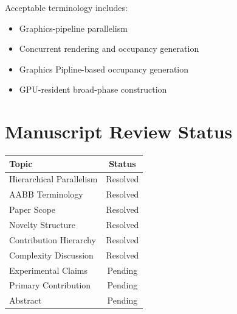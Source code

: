 Acceptable terminology includes:

\begin{itemize}
\item Graphics-pipeline parallelism
\item Concurrent rendering and occupancy generation
\item Graphics Pipline-based occupancy generation
\item GPU-resident broad-phase construction
\end{itemize}


\section{Manuscript Review Status}

\begin{tabular}{|l|c|}
\hline
Topic & Status \\
\hline
Hierarchical Parallelism  &     Resolved \\
AABB Terminology          &    Resolved \\
Paper Scope                &   Resolved\\
Novelty Structure          &   Resolved\\
Contribution Hierarchy     &   Resolved\\
Complexity Discussion  &       Resolved\\
Experimental Claims     &      Pending\\
Primary Contribution   &       Pending\\
Abstract                &      Pending\\
\hline
\end{tabular}

